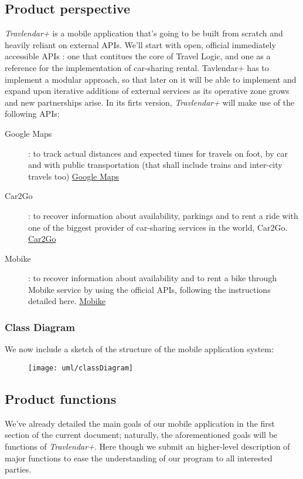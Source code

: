 \subsection{Product perspective}

\textit{Travlendar+} is a mobile application that’s going to be built from scratch and heavily reliant on external APIs. 
We’ll start with open, official immediately accessible APIs : one that contitues the core of Travel Logic, and one as a reference for the implementation of car-sharing rental. 
Tavlendar+ has to implement a modular approach, so that later on it will be able to implement and expand upon iterative additions of external services as its operative zone grows and new partnerships arise.
In its firts version, \textit{Travlendar+} will make use of the following APIs:
\begin{description}

	\item[Google Maps] : to track actual distances and expected times for travels on foot, by car and with public transportation (that shall include trains and inter-city travels too) 
	\href{https://developers.google.com/maps/}{Google Maps}
	\item[Car2Go] : to recover information about availability, parkings and to rent a ride with one of the biggest provider of car-sharing services in the world, Car2Go.
	\href{https://github.com/car2go/openAPI}{Car2Go}
	\item[Mobike] : to recover information about availability and to rent a bike through Mobike service by using the official APIs, following the instructions detailed here.
	\href{https://github.com/ubahnverleih/WoBike}{Mobike}


\end{description}

	\newpage
	\subsubsection{Class Diagram}
		We now include a sketch of the structure of the mobile application system:
		\begin{figure}[H]
			\texttt{[image: uml/classDiagram]}
		\end{figure}				
			
\subsection{Product functions}
	
 We’ve already detailed the main goals of our mobile application in the first section of the current document; naturally, the aforementioned goals will be functions of \textit{Travlendar+}.
Here though we submit an higher-level description of major functions to ease the understanding of our program to all interested parties.
		
